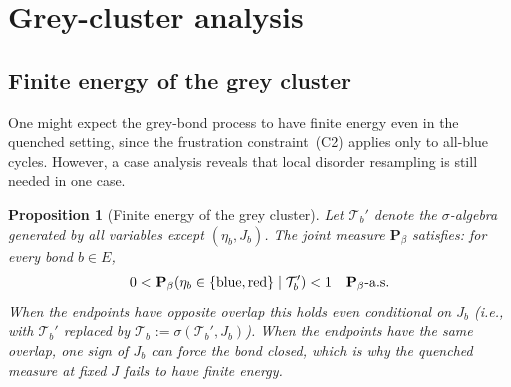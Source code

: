 \documentclass[11pt]{article}
\newtheorem{proposition}[theorem]{Proposition}
\numberwithin{theorem}{section}
\theoremstyle{remark}
\begin{document}
\section{Grey-cluster analysis}\label{sec:energy}

\subsection{Finite energy of the grey cluster}

One might expect the grey-bond process to have finite energy even in the quenched setting, since the frustration constraint~(C2) applies only to all-blue cycles.
However, a case analysis reveals that local disorder resampling is still needed in one case.

\begin{proposition}[Finite energy of the grey cluster]\label{prop:grey-fe}
Let $\mathcal{T}_b'$ denote the $\sigma$-algebra generated by all variables except $(\eta_b, J_b)$.
The joint measure $\mathbf{P}_\beta$ satisfies: for every bond $b \in E$,
\[
  0 < \mathbf{P}_\beta(\eta_b \in \{\textup{blue}, \textup{red}\} \mid \mathcal{T}_b') < 1 \quad \mathbf{P}_\beta\text{-a.s.}
\]
When the endpoints have opposite overlap this holds even conditional on $J_b$ (i.e., with $\mathcal{T}_b' $ replaced by $\mathcal{T}_b := \sigma(\mathcal{T}_b' , J_b)$).
When the endpoints have the same overlap, one sign of $J_b$ can force the bond closed, which is why the quenched measure at fixed $J$ fails to have finite energy.
\end{proposition}
\end{document}

